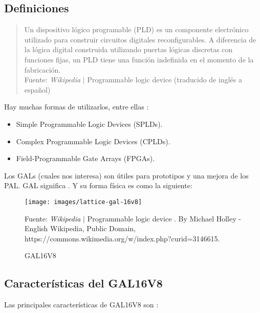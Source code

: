 \documentclass{article}
\begin{document}
    \subsection{Definiciones}

    \begin{quote}
        Un dispositivo lógico programable (PLD) es un componente electrónico
        utilizado para construir circuitos digitales reconfigurables. A
        diferencia de la lógica digital construida utilizando puertas lógicas
        discretas con funciones fijas, un PLD tiene una función indefinida en
        el momento de la fabricación.\\ \footnotesize
        Fuente: \textit{Wikipedia} $\mid$ Programmable logic device
        \cite{wikipedia-pld-2022} (traducido de inglés a español)
    \end{quote}

    Hay muchas formas de utilizarlos, entre ellas \cite{wikipedia-pld-2022}:

    \begin{itemize}
        \item Simple Programmable Logic Devices (SPLDs).
        \item Complex Programmable Logic Devices (CPLDs).
        \item Field-Programmable Gate Arrays (FPGAs).
    \end{itemize}

    Los GALs (cuales nos interesa) son útiles para prototipos y una mejora de
    los PAL. GAL significa . Y
    su forma física es como la siguiente:

    \begin{figure}[H]
        \centering
        \texttt{[image: images/lattice-gal-16v8]}
        \caption{GAL16V8}\footnotesize
        Fuente: \textit{Wikipedia} $\mid$  Programmable logic device
        \cite{wikipedia-pld-2022}. By Michael Holley - English Wikipedia,
        Public Domain, https://commons.wikimedia.org/w/index.php?curid=3146615.
    \end{figure}

    \subsection{Características del GAL16V8}

    Las principales características de GAL16V8 son
    \cite{lattice-semiconductor-corp-2004}:
\end{document}
